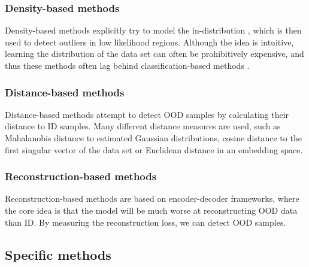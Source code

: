 \documentclass[UKenglish]{uiomasterthesis} %
\theoremstyle{definition}
\begin{document}


\subsubsection{Density-based methods}

Density-based methods explicitly try to model the in-distribution \cite{oodoverview}, which is then used to detect outliers in low likelihood regions. Although the idea is intuitive, learning the distribution of the data set can often be prohibitively expensive, and thus these methods often lag behind classification-based methods \cite{oodoverview}.
\\

\subsubsection{Distance-based methods}

Distance-based methods attempt to detect OOD samples by calculating their distance to ID samples. Many different distance measures are used, such as Mahalanobis distance to estimated Gaussian distributions, cosine distance to the first singular vector of the data set or Euclidean distance in an embedding space.
\\

\subsubsection{Reconstruction-based methods}

Reconstruction-based methods are based on encoder-decoder frameworks, where the core idea is that the model will be much worse at reconstructing OOD data than ID. By measuring the reconstruction loss, we can detect OOD samples.
\\

\subsection{Specific methods} \label{ood_specific}
\end{document}
